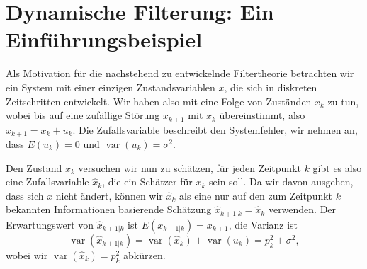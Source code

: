 %
%
%

\section{Dynamische Filterung: Ein Einführungsbeispiel
\label{filter:section:einfuerung}}
Als Motivation für die nachstehend zu entwickelnde Filtertheorie betrachten
wir ein System mit einer einzigen Zustandsvariablen $x$, die sich in diskreten
Zeitschritten entwickelt.
Wir haben also mit eine Folge von Zuständen $x_k$ zu tun, wobei
bis auf eine zufällige Störung $x_{k+1}$ mit $x_k$ übereinstimmt,
also $x_{k+1}=x_k+u_k$.
Die Zufallsvariable beschreibt den Systemfehler, wir
nehmen an, dass $E(u_k)=0$ und $\operatorname{var}(u_k)=\sigma^2$.

Den Zustand $x_k$ versuchen wir nun zu schätzen, für jeden Zeitpunkt
$k$ gibt es also eine Zufallsvariable $\hat x_k$, die ein Schätzer für
$x_k$ sein soll.
Da wir davon ausgehen, dass sich $x$ nicht ändert, können wir $\hat x_k$
als eine nur auf den zum Zeitpunkt $k$ bekannten Informationen basierende
Schätzung $\hat x_{k+1|k}=\hat x_k$ verwenden.
Der Erwartungswert von $\hat x_{k+1|k}$ ist $E(x_{k+1|k})=x_{k+1}$, die Varianz
ist
\[
\operatorname{var}(\hat x_{k+1|k})
=\operatorname{var}(\hat x_k)+\operatorname{var}(u_k)=p_k^2+\sigma^2,
\]
wobei wir $\operatorname{var}(\hat x_k)=p_k^2$ abkürzen.

